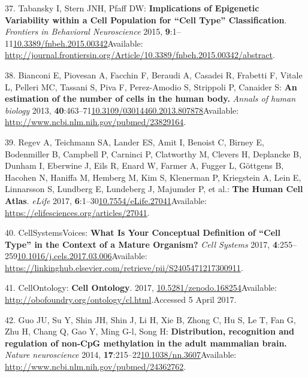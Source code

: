 \documentclass[
]{book}
\begin{document}
\leavevmode\hypertarget{ref-Tabansky2015}{}%
37. Tabansky I, Stern JNH, Pfaff DW: \textbf{Implications of Epigenetic Variability within a Cell Population for ``Cell Type'' Classification}. \emph{Frontiers in Behavioral Neuroscience} 2015, \textbf{9}:1--11\href{https://doi.org/10.3389/fnbeh.2015.00342}{10.3389/fnbeh.2015.00342}Available: \url{http://journal.frontiersin.org/Article/10.3389/fnbeh.2015.00342/abstract}.

\leavevmode\hypertarget{ref-Bianconi2013}{}%
38. Bianconi E, Piovesan A, Facchin F, Beraudi A, Casadei R, Frabetti F, Vitale L, Pelleri MC, Tassani S, Piva F, Perez-Amodio S, Strippoli P, Canaider S: \textbf{An estimation of the number of cells in the human body.} \emph{Annals of human biology} 2013, \textbf{40}:463--71\href{https://doi.org/10.3109/03014460.2013.807878}{10.3109/03014460.2013.807878}Available: \url{http://www.ncbi.nlm.nih.gov/pubmed/23829164}.

\leavevmode\hypertarget{ref-Regev2017}{}%
39. Regev A, Teichmann SA, Lander ES, Amit I, Benoist C, Birney E, Bodenmiller B, Campbell P, Carninci P, Clatworthy M, Clevers H, Deplancke B, Dunham I, Eberwine J, Eils R, Enard W, Farmer A, Fugger L, Göttgens B, Hacohen N, Haniffa M, Hemberg M, Kim S, Klenerman P, Kriegstein A, Lein E, Linnarsson S, Lundberg E, Lundeberg J, Majumder P, et al.: \textbf{The Human Cell Atlas}. \emph{eLife} 2017, \textbf{6}:1--30\href{https://doi.org/10.7554/eLife.27041}{10.7554/eLife.27041}Available: \url{https://elifesciences.org/articles/27041}.

\leavevmode\hypertarget{ref-CellSystemsCellType2017}{}%
40. CellSystemsVoices: \textbf{What Is Your Conceptual Definition of ``Cell Type'' in the Context of a Mature Organism?} \emph{Cell Systems} 2017, \textbf{4}:255--259\href{https://doi.org/10.1016/j.cels.2017.03.006}{10.1016/j.cels.2017.03.006}Available: \url{https://linkinghub.elsevier.com/retrieve/pii/S2405471217300911}.

\leavevmode\hypertarget{ref-CellOntologyOBO}{}%
41. CellOntology: \textbf{Cell Ontology}. 2017, \href{https://doi.org/10.5281/zenodo.168254}{10.5281/zenodo.168254}Available: \url{http://obofoundry.org/ontology/cl.html}.Accessed 5 April 2017.

\leavevmode\hypertarget{ref-Guo2014a}{}%
42. Guo JU, Su Y, Shin JH, Shin J, Li H, Xie B, Zhong C, Hu S, Le T, Fan G, Zhu H, Chang Q, Gao Y, Ming G-l, Song H: \textbf{Distribution, recognition and regulation of non-CpG methylation in the adult mammalian brain.} \emph{Nature neuroscience} 2014, \textbf{17}:215--22\href{https://doi.org/10.1038/nn.3607}{10.1038/nn.3607}Available: \url{http://www.ncbi.nlm.nih.gov/pubmed/24362762}.
\end{document}
